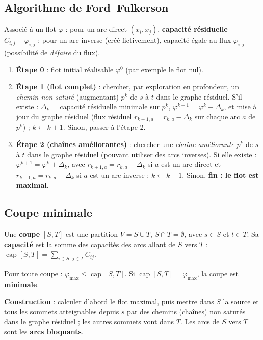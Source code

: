 \documentclass[11pt,a4paper]{article}
\begin{document}
\subsection{Algorithme de Ford--Fulkerson}
\begin{definition}
Associé à un flot $\varphi$ : pour un arc direct $(x_i,x_j)$, \textbf{capacité résiduelle} $C_{i,j}-\varphi_{i,j}$ ; pour un arc inverse (créé fictivement), capacité égale au flux $\varphi_{i,j}$ (possibilité de \emph{défaire} du flux).
\end{definition}

\begin{algo}
\begin{enumerate}[nosep]
\item \textbf{Étape 0} : flot initial réalisable $\varphi^0$ (par exemple le flot nul).
\item \textbf{Étape 1 (flot complet)} : chercher, par exploration en profondeur, un \emph{chemin non saturé} (augmentant) $p^k$ de $s$ à $t$ dans le graphe résiduel. S'il existe : $\Delta_k$ = capacité résiduelle minimale sur $p^k$, $\varphi^{k+1}=\varphi^k+\Delta_k$, et mise à jour du graphe résiduel (flux résiduel $r_{k+1,a}=r_{k,a}-\Delta_k$ sur chaque arc $a$ de $p^k$) ; $k\leftarrow k+1$. Sinon, passer à l'étape 2.
\item \textbf{Étape 2 (chaînes améliorantes)} : chercher une \emph{chaîne améliorante} $p^k$ de $s$ à $t$ dans le graphe résiduel (pouvant utiliser des arcs inverses). Si elle existe : $\varphi^{k+1}=\varphi^k+\Delta_k$, avec $r_{k+1,a}=r_{k,a}-\Delta_k$ si $a$ est un arc direct et $r_{k+1,a}=r_{k,a}+\Delta_k$ si $a$ est un arc inverse ; $k\leftarrow k+1$. Sinon, \textbf{fin : le flot est maximal}.
\end{enumerate}
\end{algo}

\subsection{Coupe minimale}
\begin{definition}[Coupe]
Une \textbf{coupe} $[S,T]$ est une partition $V=S\cup T$, $S\cap T=\emptyset$, avec $s\in S$ et $t\in T$. Sa \textbf{capacité} est la somme des capacités des arcs allant de $S$ vers $T$ :
$\displaystyle \operatorname{cap}[S,T]=\sum_{i\in S,\,j\in T}C_{ij}.$
\end{definition}

\begin{retenir}
Pour toute coupe : $\varphi_{\max}\le\operatorname{cap}[S,T]$. Si $\operatorname{cap}[S,T]=\varphi_{\max}$, la coupe est \textbf{minimale}.

\textbf{Construction} : calculer d'abord le flot maximal, puis mettre dans $S$ la source et tous les sommets atteignables depuis $s$ par des chemins (chaînes) non saturés dans le graphe résiduel ; les autres sommets vont dans $T$. Les arcs de $S$ vers $T$ sont les \textbf{arcs bloquants}.
\end{retenir}
\end{document}
